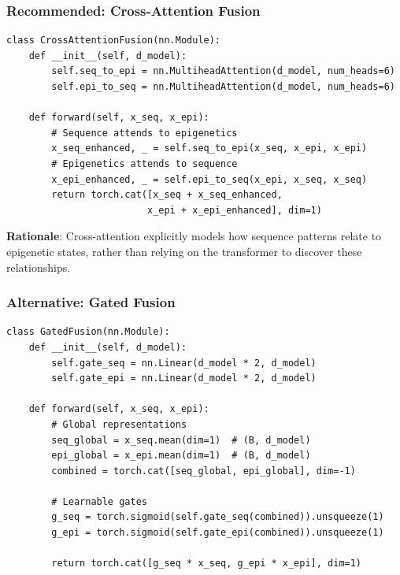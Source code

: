 \documentclass[11pt,a4paper]{article}
\begin{document}
\subsubsection{Recommended: Cross-Attention Fusion}

\begin{verbatim}
class CrossAttentionFusion(nn.Module):
    def __init__(self, d_model):
        self.seq_to_epi = nn.MultiheadAttention(d_model, num_heads=6)
        self.epi_to_seq = nn.MultiheadAttention(d_model, num_heads=6)
    
    def forward(self, x_seq, x_epi):
        # Sequence attends to epigenetics
        x_seq_enhanced, _ = self.seq_to_epi(x_seq, x_epi, x_epi)
        # Epigenetics attends to sequence
        x_epi_enhanced, _ = self.epi_to_seq(x_epi, x_seq, x_seq)
        return torch.cat([x_seq + x_seq_enhanced, 
                         x_epi + x_epi_enhanced], dim=1)
\end{verbatim}

\textbf{Rationale}: Cross-attention explicitly models how sequence patterns relate to epigenetic states, rather than relying on the transformer to discover these relationships.

\subsubsection{Alternative: Gated Fusion}

\begin{verbatim}
class GatedFusion(nn.Module):
    def __init__(self, d_model):
        self.gate_seq = nn.Linear(d_model * 2, d_model)
        self.gate_epi = nn.Linear(d_model * 2, d_model)
    
    def forward(self, x_seq, x_epi):
        # Global representations
        seq_global = x_seq.mean(dim=1)  # (B, d_model)
        epi_global = x_epi.mean(dim=1)  # (B, d_model)
        combined = torch.cat([seq_global, epi_global], dim=-1)
        
        # Learnable gates
        g_seq = torch.sigmoid(self.gate_seq(combined)).unsqueeze(1)
        g_epi = torch.sigmoid(self.gate_epi(combined)).unsqueeze(1)
        
        return torch.cat([g_seq * x_seq, g_epi * x_epi], dim=1)
\end{verbatim}

\end{document}
